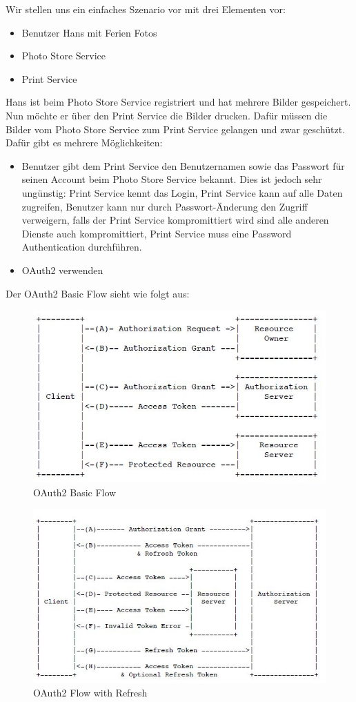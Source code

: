 Wir stellen uns ein einfaches Szenario vor mit drei Elementen vor:

\begin{itemize}
	\item Benutzer Hans mit Ferien Fotos
	\item Photo Store Service
	\item Print Service
\end{itemize}

Hans ist beim Photo Store Service registriert und hat mehrere Bilder gespeichert. Nun möchte er über den Print Service die Bilder drucken. Dafür müssen die Bilder vom Photo Store Service zum Print Service gelangen und zwar geschützt. Dafür gibt es mehrere Möglichkeiten:

\begin{itemize}
	\item Benutzer gibt dem Print Service den Benutzernamen sowie das Passwort für seinen Account beim Photo Store Service bekannt. Dies ist jedoch sehr ungünstig: Print Service kennt das Login, Print Service kann auf alle Daten zugreifen, Benutzer kann nur durch Passwort-Änderung den Zugriff verweigern, falls der Print Service kompromittiert wird sind alle anderen Dienste auch kompromittiert, Print Service muss eine Password Authentication durchführen.
	
	\item OAuth2 verwenden
\end{itemize}

Der OAuth2 Basic Flow sieht wie folgt aus:
\begin{figure}[h!]
\centering
\includegraphics[width=0.7\linewidth]{fig/oauth2flow}
\caption{OAuth2 Basic Flow}
\label{fig:oauth2flow}
\end{figure}

\begin{figure}[h!]
	\centering
	\includegraphics[width=0.7\linewidth]{fig/oauth2flow-refresh}
	\caption{OAuth2 Flow with Refresh}
	\label{fig:oauth2flow-refresh}
\end{figure}

